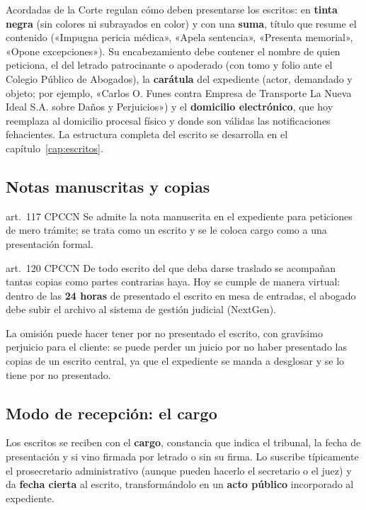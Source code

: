 \documentclass[12pt,oneside]{book}
\begin{document}
Acordadas de la Corte regulan cómo deben presentarse los escritos: en \textbf{tinta negra} (sin colores ni subrayados en color) y con una \textbf{suma}, título que resume el contenido («Impugna pericia médica», «Apela sentencia», «Presenta memorial», «Opone excepciones»). Su encabezamiento debe contener el nombre de quien peticiona, el del letrado patrocinante o apoderado (con tomo y folio ante el Colegio Público de Abogados), la \textbf{carátula} del expediente (actor, demandado y objeto; por ejemplo, «Carlos O. Funes contra Empresa de Transporte La Nueva Ideal S.A. sobre Daños y Perjuicios») y el \textbf{domicilio electrónico}, que hoy reemplaza al domicilio procesal físico y donde son válidas las notificaciones fehacientes. La estructura completa del escrito se desarrolla en el capítulo~\ref{cap:escritos}.

\subsection{Notas manuscritas y copias}

\begin{regla}{art.~117 CPCCN}
Se admite la nota manuscrita en el expediente para peticiones de mero trámite; se trata como un escrito y se le coloca cargo como a una presentación formal.
\end{regla}

\begin{regla}{art.~120 CPCCN}
De todo escrito del que deba darse traslado se acompañan tantas copias como partes contrarias haya. Hoy se cumple de manera virtual: dentro de las \textbf{24 horas} de presentado el escrito en mesa de entradas, el abogado debe subir el archivo al sistema de gestión judicial (NextGen).
\end{regla}

\begin{importante}
La omisión puede hacer tener por no presentado el escrito, con gravísimo perjuicio para el cliente: se puede perder un juicio por no haber presentado las copias de un escrito central, ya que el expediente se manda a desglosar y se lo tiene por no presentado.
\end{importante}

\subsection{Modo de recepción: el cargo}

Los escritos se reciben con el \textbf{cargo}, constancia que indica el tribunal, la fecha de presentación y si vino firmada por letrado o sin su firma. Lo suscribe típicamente el prosecretario administrativo (aunque pueden hacerlo el secretario o el juez) y da \textbf{fecha cierta} al escrito, transformándolo en un \textbf{acto público} incorporado al expediente.
\end{document}
